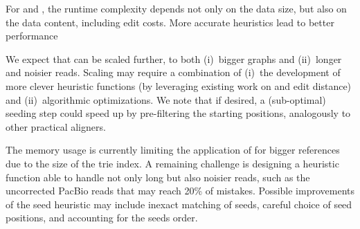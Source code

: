 For \dijkstra and \astarix, the runtime complexity depends not only on the data
size, but also on the data content, including edit costs. More accurate
heuristics lead to better \A performance~\cite{pearl_discovery_1983}

We expect that \astarix can be scaled further, to both (i)~bigger graphs and
(ii)~longer and noisier reads. Scaling \astarix may require a combination of
(i)~the development of more clever heuristic functions (by leveraging existing
work on \A and edit distance) and (ii)~algorithmic optimizations. We note that
if desired, a (sub-optimal) seeding step could speed up \astarix by
pre-filtering the starting positions, analogously to other practical aligners.

The memory usage is currently limiting the application of \astarix for bigger
references due to the size of the trie index. A remaining challenge is designing
a heuristic function able to handle not only long but also noisier reads, such
as the uncorrected PacBio reads that may reach 20\% of mistakes. Possible
improvements of the seed heuristic may include inexact matching of seeds,
careful choice of seed positions, and accounting for the seeds order.

